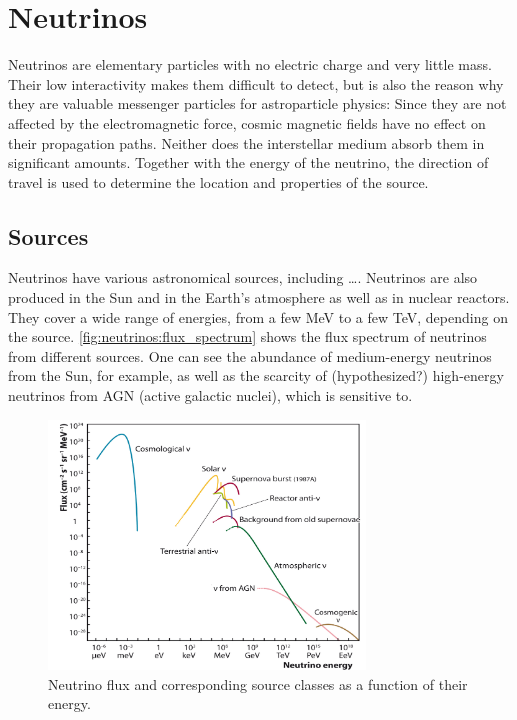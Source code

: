 \section{Neutrinos}

Neutrinos are elementary particles with no electric charge and very little mass.
Their low interactivity
  makes them difficult to detect,
  but is also the reason why they are valuable messenger particles for astroparticle physics:
Since they are not affected by the electromagnetic force,
  cosmic magnetic fields have no effect on their propagation paths. \cite{neutrinos_katz}
Neither does the interstellar medium absorb them in significant amounts.
Together with the energy of the neutrino,
  the direction of travel %
  is used to determine the location and properties of the source. \cite{neutrinos_katz}


\subsection{Sources}
Neutrinos have various astronomical sources,
including
  …. %
Neutrinos are also produced in
  the Sun
  and in the Earth's atmosphere
  as well as in nuclear reactors.
They cover a wide range of energies, from a few \si{\mega\electronvolt} to a few \si{\tera\electronvolt}, %
  depending on the source. \citationneeded{}
%
\autoref{fig:neutrinos:flux_spectrum} shows the flux spectrum of neutrinos from different sources.
One can see
  the abundance of medium-energy neutrinos from the Sun,
    for example,
  as well as the scarcity of (hypothesized?) high-energy neutrinos from AGN (active galactic nuclei),
    which \icecube{} is sensitive to.

\begin{figure}
  \centering
  \includegraphics[width=0.75\textwidth]{content/plots/halftime/neutrinos-energy.png}
  \caption{
    Neutrino flux and corresponding source classes as a function of their energy.
    \cite{spiering2012} %
  }
  \label{fig:neutrinos:flux_spectrum}
\end{figure}


